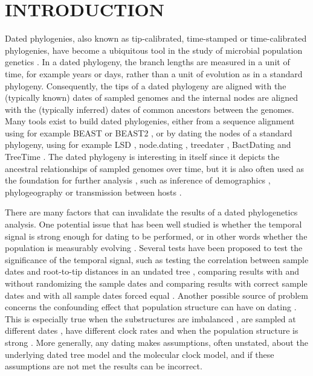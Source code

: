 \documentclass{article}
\begin{document}
\newpage
\section*{INTRODUCTION}

Dated phylogenies, also known as tip-calibrated, time-stamped or time-calibrated phylogenies, have become a ubiquitous tool in the study of microbial population genetics 
\citep{Drummond2003,Biek2015,rieuxInferencesTipcalibratedPhylogenies2016}. In a dated phylogeny, the branch lengths are measured in a unit of time, for example years or days,
rather than a unit of evolution as in a standard phylogeny. Consequently, the tips of a dated phylogeny are aligned with the (typically known) dates of sampled genomes and
the internal nodes are aligned with the (typically inferred) dates of common ancestors between the genomes.
Many tools exist to build dated phylogenies, either from a sequence alignment using for example BEAST \citep{Suchard2018} or BEAST2 \citep{Bouckaert2019}, or by
dating the nodes of a standard phylogeny, using for example 
LSD \citep{To2016}, node.dating \citep{Jones2017}, treedater \citep{Volz2017}, BactDating \citep{Didelot2018} and TreeTime \citep{Sagulenko2018}.
The dated phylogeny is interesting in itself since it depicts the ancestral relationships of sampled genomes
over time, but it is also often used as the foundation for further analysis \citep{Didelot2022}, such as inference
of demographics \citep{Baele2016}, phylogeography \citep{Lemey2009} 
or transmission between hosts \citep{Didelot2017}.

There are many factors that can invalidate the results of a dated phylogenetics analysis.
One potential issue that has been well studied is whether the temporal signal is 
strong enough for dating to be performed, or in other words whether the population
is measurably evolving \citep{Drummond2003,Biek2015}. Several tests have been proposed
to test the significance of the temporal signal, such as testing the correlation between
sample dates and root-to-tip distances in an undated tree \citep{Rambaut2016a},
comparing results with and without randomizing the sample dates \citep{Duchene2015a} and
comparing results with correct sample dates and with all sample dates forced equal 
\citep{Rambaut2000,Duchene2020}. 
Another possible source of problem concerns the confounding effect that population structure can have on dating 
\citep{Duchene2015a,Murray2016}. This is especially true when the substructures are 
imbalanced \citep{ducheneTreeImbalanceCauses2015}, are sampled
at different dates \citep{tongComparisonMethodsEstimating2018}, have different clock rates
\citep{wertheimInconsistenciesEstimatingAge2012}  and when the population structure is strong 
\citep{navascuesElevatedSubstitutionRate2009}. 
More generally, any dating makes assumptions, often unstated, about the underlying dated tree model 
and the molecular clock model, and if these assumptions are not met the results can be incorrect.
\end{document}
